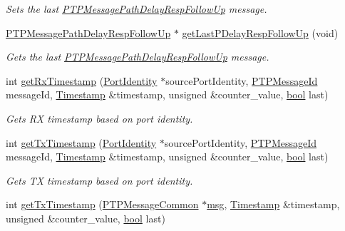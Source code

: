\begin{DoxyCompactItemize}
\begin{DoxyCompactList}\small\item\em Sets the last \hyperlink{class_p_t_p_message_path_delay_resp_follow_up}{P\+T\+P\+Message\+Path\+Delay\+Resp\+Follow\+Up} message. \end{DoxyCompactList}\item 
\hyperlink{class_p_t_p_message_path_delay_resp_follow_up}{P\+T\+P\+Message\+Path\+Delay\+Resp\+Follow\+Up} $\ast$ \hyperlink{class_ether_port_ae72309bd695c8d5041590b9f030ec8d7}{get\+Last\+P\+Delay\+Resp\+Follow\+Up} (void)
\begin{DoxyCompactList}\small\item\em Gets the last \hyperlink{class_p_t_p_message_path_delay_resp_follow_up}{P\+T\+P\+Message\+Path\+Delay\+Resp\+Follow\+Up} message. \end{DoxyCompactList}\item 
int \hyperlink{class_ether_port_a27ce3ecc12474bcac4e8a59cda91a953}{get\+Rx\+Timestamp} (\hyperlink{class_port_identity}{Port\+Identity} $\ast$source\+Port\+Identity, \hyperlink{class_p_t_p_message_id}{P\+T\+P\+Message\+Id} message\+Id, \hyperlink{class_timestamp}{Timestamp} \&timestamp, unsigned \&counter\+\_\+value, \hyperlink{avb__gptp_8h_af6a258d8f3ee5206d682d799316314b1}{bool} last)
\begin{DoxyCompactList}\small\item\em Gets RX timestamp based on port identity. \end{DoxyCompactList}\item 
int \hyperlink{class_ether_port_aa89b02ea4c3b6edddaf69fbdb03a2fe1}{get\+Tx\+Timestamp} (\hyperlink{class_port_identity}{Port\+Identity} $\ast$source\+Port\+Identity, \hyperlink{class_p_t_p_message_id}{P\+T\+P\+Message\+Id} message\+Id, \hyperlink{class_timestamp}{Timestamp} \&timestamp, unsigned \&counter\+\_\+value, \hyperlink{avb__gptp_8h_af6a258d8f3ee5206d682d799316314b1}{bool} last)
\begin{DoxyCompactList}\small\item\em Gets TX timestamp based on port identity. \end{DoxyCompactList}\item 
int \hyperlink{class_ether_port_af3db370481d2d6bb947f98987b8bf308}{get\+Tx\+Timestamp} (\hyperlink{class_p_t_p_message_common}{P\+T\+P\+Message\+Common} $\ast$\hyperlink{openavb__log_8c_a0c7e58a50354c4a4d6dad428d0e47029}{msg}, \hyperlink{class_timestamp}{Timestamp} \&timestamp, unsigned \&counter\+\_\+value, \hyperlink{avb__gptp_8h_af6a258d8f3ee5206d682d799316314b1}{bool} last)

\end{DoxyCompactItemize}
